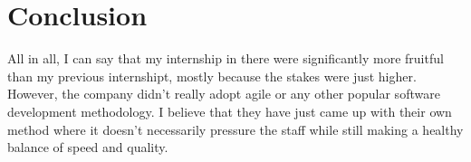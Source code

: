 \chapter{Conclusion}
All in all, I can say that my internship in there were significantly more 
fruitful than my previous internshipt, mostly because the stakes were just 
higher. However, the company didn't really adopt agile or any other popular 
software development methodology. I believe that they have just came up 
with their own method where it doesn't necessarily pressure the staff 
while still making a healthy balance of speed and quality.
